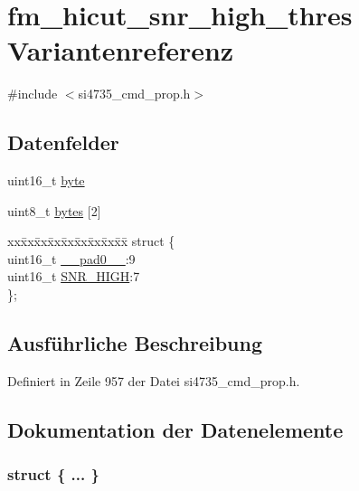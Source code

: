 \hypertarget{unionfm__hicut__snr__high__thres}{}\section{fm\+\_\+hicut\+\_\+snr\+\_\+high\+\_\+thres Variantenreferenz}
\label{unionfm__hicut__snr__high__thres}


{\ttfamily \#include $<$si4735\+\_\+cmd\+\_\+prop.\+h$>$}

\subsection*{Datenfelder}
\begin{DoxyCompactItemize}
\item 
uint16\+\_\+t \hyperlink{unionfm__hicut__snr__high__thres_ab0549c1b5ea980a02e7eab77e21fea49}{byte}
\item 
uint8\+\_\+t \hyperlink{unionfm__hicut__snr__high__thres_a46e4c05d20a047ec169f60d3167e912e}{bytes} \mbox{[}2\mbox{]}
\item 
\begin{tabbing}
xx\=xx\=xx\=xx\=xx\=xx\=xx\=xx\=xx\=\kill
struct \{\\
\>uint16\_t \hyperlink{unionfm__hicut__snr__high__thres_a77132c2c26a75f5b8751b235cda23828}{\_\_pad0\_\_}:9\\
\>uint16\_t \hyperlink{unionfm__hicut__snr__high__thres_a58d28839dfa4529ecedf84fc6be5de83}{SNR\_HIGH}:7\\
\}; \\

\end{tabbing}\end{DoxyCompactItemize}


\subsection{Ausführliche Beschreibung}


Definiert in Zeile 957 der Datei si4735\+\_\+cmd\+\_\+prop.\+h.



\subsection{Dokumentation der Datenelemente}
\hypertarget{unionfm__hicut__snr__high__thres_a333a28706a30ec29ac0032d96eae9d22}{}\subsubsection[{"@117}]{\setlength{\rightskip}{0pt plus 5cm}struct \{ ... \} }\label{unionfm__hicut__snr__high__thres_a333a28706a30ec29ac0032d96eae9d22}
\hypertarget{unionfm__hicut__snr__high__thres_a77132c2c26a75f5b8751b235cda23828}{}
